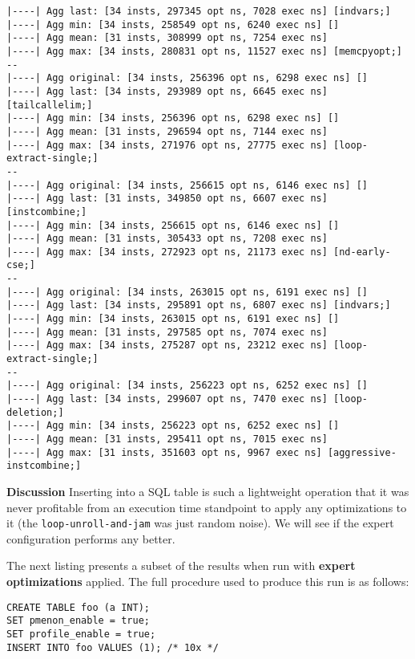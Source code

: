 \documentclass{vldb}
\begin{document}
\begin{lstlisting}
|----| Agg last: [34 insts, 297345 opt ns, 7028 exec ns] [indvars;]
|----| Agg min: [34 insts, 258549 opt ns, 6240 exec ns] []
|----| Agg mean: [31 insts, 308999 opt ns, 7254 exec ns]
|----| Agg max: [34 insts, 280831 opt ns, 11527 exec ns] [memcpyopt;]
--
|----| Agg original: [34 insts, 256396 opt ns, 6298 exec ns] []
|----| Agg last: [34 insts, 293989 opt ns, 6645 exec ns] [tailcallelim;]
|----| Agg min: [34 insts, 256396 opt ns, 6298 exec ns] []
|----| Agg mean: [31 insts, 296594 opt ns, 7144 exec ns]
|----| Agg max: [34 insts, 271976 opt ns, 27775 exec ns] [loop-extract-single;]
--
|----| Agg original: [34 insts, 256615 opt ns, 6146 exec ns] []
|----| Agg last: [31 insts, 349850 opt ns, 6607 exec ns] [instcombine;]
|----| Agg min: [34 insts, 256615 opt ns, 6146 exec ns] []
|----| Agg mean: [31 insts, 305433 opt ns, 7208 exec ns]
|----| Agg max: [34 insts, 272923 opt ns, 21173 exec ns] [nd-early-cse;]
--
|----| Agg original: [34 insts, 263015 opt ns, 6191 exec ns] []
|----| Agg last: [34 insts, 295891 opt ns, 6807 exec ns] [indvars;]
|----| Agg min: [34 insts, 263015 opt ns, 6191 exec ns] []
|----| Agg mean: [31 insts, 297585 opt ns, 7074 exec ns]
|----| Agg max: [34 insts, 275287 opt ns, 23212 exec ns] [loop-extract-single;]
--
|----| Agg original: [34 insts, 256223 opt ns, 6252 exec ns] []
|----| Agg last: [34 insts, 299607 opt ns, 7470 exec ns] [loop-deletion;]
|----| Agg min: [34 insts, 256223 opt ns, 6252 exec ns] []
|----| Agg mean: [31 insts, 295411 opt ns, 7015 exec ns]
|----| Agg max: [31 insts, 351603 opt ns, 9967 exec ns] [aggressive-instcombine;]
\end{lstlisting}

\textbf{Discussion} Inserting into a SQL table is such a lightweight operation that it was never profitable from an execution time standpoint to apply any optimizations to it (the \lstinline{loop-unroll-and-jam} was just random noise). We will see if the expert configuration performs any better.

The next listing presents a subset of the results when run with \textbf{expert optimizations} applied. The full procedure used to produce this run is as follows:
\begin{lstlisting}
CREATE TABLE foo (a INT);
SET pmenon_enable = true;
SET profile_enable = true;
INSERT INTO foo VALUES (1); /* 10x */
\end{lstlisting}
\end{document}
